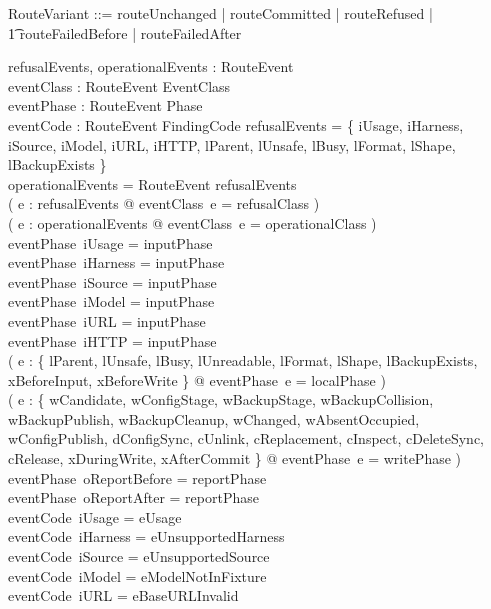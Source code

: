 \documentclass{article}
\begin{document}
\begin{zed}
	RouteVariant ::= routeUnchanged | routeCommitted | routeRefused | \\
	\t1 routeFailedBefore | routeFailedAfter
\end{zed}

\begin{axdef}
	refusalEvents, operationalEvents : \power RouteEvent \\
	eventClass : RouteEvent \fun EventClass \\
	eventPhase : RouteEvent \fun Phase \\
	eventCode : RouteEvent \fun FindingCode
	\where
	refusalEvents = \{ iUsage, iHarness, iSource, iModel, iURL, iHTTP,
	lParent, lUnsafe, lBusy, lFormat, lShape, lBackupExists \} \\
	operationalEvents = RouteEvent \setminus refusalEvents \\
	( \forall e : refusalEvents @ eventClass~e = refusalClass ) \\
	( \forall e : operationalEvents @ eventClass~e = operationalClass ) \\
	eventPhase~iUsage = inputPhase \\
	eventPhase~iHarness = inputPhase \\
	eventPhase~iSource = inputPhase \\
	eventPhase~iModel = inputPhase \\
	eventPhase~iURL = inputPhase \\
	eventPhase~iHTTP = inputPhase \\
	( \forall e : \{ lParent, lUnsafe, lBusy, lUnreadable, lFormat, lShape,
	lBackupExists, xBeforeInput, xBeforeWrite \} @ eventPhase~e = localPhase ) \\
	( \forall e : \{ wCandidate, wConfigStage, wBackupStage, wBackupCollision,
	wBackupPublish, wBackupCleanup, wChanged, wAbsentOccupied, wConfigPublish,
	dConfigSync, cUnlink, cReplacement, cInspect, cDeleteSync, cRelease,
	xDuringWrite, xAfterCommit \} @ eventPhase~e = writePhase ) \\
	eventPhase~oReportBefore = reportPhase \\
	eventPhase~oReportAfter = reportPhase \\
	eventCode~iUsage = eUsage \\
	eventCode~iHarness = eUnsupportedHarness \\
	eventCode~iSource = eUnsupportedSource \\
	eventCode~iModel = eModelNotInFixture \\
	eventCode~iURL = eBaseURLInvalid \\

\end{axdef}
\end{document}

